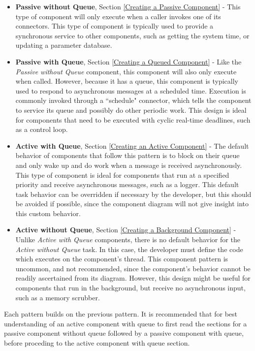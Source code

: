 \vspace{5mm} %
\begin{itemize}
  \item \textbf{Passive without Queue}, Section \ref{Creating a Passive Component} - This type of component will only execute when a caller invokes one of its connectors. This type of component is typically used to provide a synchronous service to other components, such as getting the system time, or updating a parameter database.
  \item \textbf{Passive with Queue}, Section \ref{Creating a Queued Component} - Like the \textit{Passive without Queue} component, this component will also only execute when called. However, because it has a queue, this component is typically used to respond to asynchronous messages at a scheduled time. Execution is commonly invoked through a ``schedule" connector, which tells the component to service its queue and possibly do other periodic work. This design is ideal for components that need to be executed with cyclic real-time deadlines, such as a control loop.
  \item \textbf{Active with Queue}, Section \ref{Creating an Active Component} - The default behavior of components that follow this pattern is to block on their queue and only wake up and do work when a message is received asynchronously. This type of component is ideal for components that run at a specified priority and receive asynchronous messages, such as a logger. This default task behavior can be overridden if necessary by the developer, but this should be avoided if possible, since the component diagram will not give insight into this custom behavior.
  \item \textbf{Active without Queue}, Section \ref{Creating a Background Component} - Unlike \textit{Active with Queue} components, there is no default behavior for the \textit{Active without Queue} task. In this case, the developer must define the code which executes on the component's thread. This component pattern is uncommon, and not recommended, since the component's behavior cannot be readily ascertained from its diagram. However, this design might be useful for components that run in the background, but receive no asynchronous input, such as a memory scrubber.
\end{itemize}
\vspace{5mm} %

Each pattern builds on the previous pattern. It is recommended that for best understanding of an active component with queue to first read the sections for a passive component without queue followed by a passive component with queue, before proceding to the active component with queue section.

